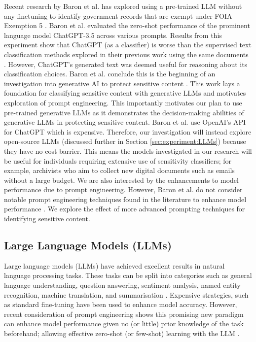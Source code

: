 Recent research by Baron et al. has explored using a pre-trained LLM without any finetuning to identify government records that are exempt under FOIA Exemption 5 \cite{baron2023using}. Baron et al. evaluated the zero-shot performance of the prominent language model ChatGPT-3.5 \cite{brown2020language} across various prompts. Results from this experiment show that ChatGPT (as a classifier) is worse than the supervised text classification methods explored in their previous work using the same documents \cite{baron2022providing}. However, ChatGPT’s generated text was deemed useful for reasoning about its classification choices. Baron et al. conclude this is the beginning of an investigation into generative AI to protect sensitive content \cite{baron2023using}. This work lays a foundation for classifying sensitive content with generative LLMs and motivates exploration of prompt engineering. This importantly motivates our plan to use pre-trained generative LLMs as it demonstrates the decision-making abilities of generative LLMs in protecting sensitive content. Baron et al. use OpenAI’s API for ChatGPT which is expensive. Therefore, our investigation will instead explore open-source LLMs (discussed further in Section \ref{sec:experiment:LLMs}) because they have no cost barrier. This means the models investigated in our research will be useful for individuals requiring extensive use of sensitivity classifiers; for example, archivists who aim to collect new digital documents such as emails without a large budget. We are also interested by the enhancements to model performance due to prompt engineering. However, Baron et al. do not consider notable prompt engineering techniques found in the literature to enhance model performance \cite{white2023prompt}. We explore the effect of more advanced prompting techniques for identifying sensitive content.

\subsection{Large Language Models (LLMs)}
Large language models (LLMs) have achieved excellent results in natural language processing tasks. These tasks can be split into categories such as general language understanding, question answering, sentiment analysis, named entity recognition, machine translation, and summarisation \cite{qiu2020pre}. Expensive strategies, such as standard fine-tuning have been used to enhance model accuracy. However, recent consideration of prompt engineering shows this promising new paradigm can enhance model performance given no (or little) prior knowledge of the task beforehand; allowing effective zero-shot (or few-shot) learning with the LLM \cite{liu2023pre}.

